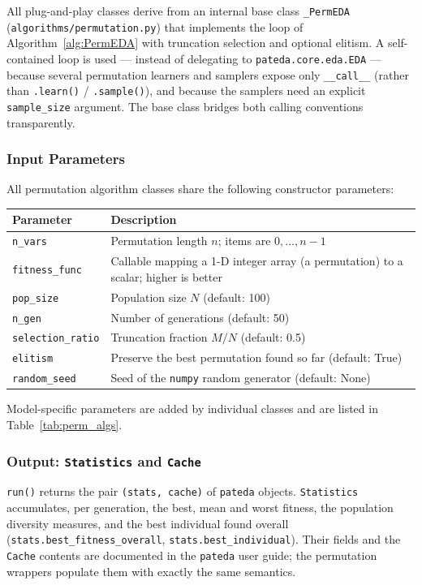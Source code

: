 \documentclass[a4paper,11pt]{article}
\begin{document}
All plug-and-play classes derive from an internal base class \texttt{\_PermEDA}
(\texttt{algorithms/permutation.py}) that implements the loop of
Algorithm~\ref{alg:PermEDA} with truncation selection and optional elitism.  A
self-contained loop is used --- instead of delegating to
\texttt{pateda.core.eda.EDA} --- because several permutation learners and
samplers expose only \texttt{\_\_call\_\_} (rather than \texttt{.learn()} /
\texttt{.sample()}), and because the samplers need an explicit
\texttt{sample\_size} argument.  The base class bridges both calling conventions
transparently.

\subsubsection{Input Parameters}

All permutation algorithm classes share the following constructor parameters:

\begin{center}
\begin{tabular}{lp{9cm}}
\toprule
Parameter & Description \\
\midrule
\texttt{n\_vars} & Permutation length $n$; items are $0,\ldots,n-1$ \\
\texttt{fitness\_func} & Callable mapping a 1-D integer array (a permutation) to
  a scalar; higher is better \\
\texttt{pop\_size} & Population size $N$ (default: 100) \\
\texttt{n\_gen} & Number of generations (default: 50) \\
\texttt{selection\_ratio} & Truncation fraction $M/N$ (default: 0.5) \\
\texttt{elitism} & Preserve the best permutation found so far (default: True) \\
\texttt{random\_seed} & Seed of the \texttt{numpy} random generator
  (default: None) \\
\bottomrule
\end{tabular}
\end{center}

\noindent Model-specific parameters are added by individual classes and are
listed in Table~\ref{tab:perm_algs}.

\subsubsection{Output: \texttt{Statistics} and \texttt{Cache}}

\texttt{run()} returns the pair \texttt{(stats, cache)} of \texttt{pateda}
objects.  \texttt{Statistics} accumulates, per generation, the best, mean and
worst fitness, the population diversity measures, and the best individual found
overall (\texttt{stats.best\_fitness\_overall}, \texttt{stats.best\_individual}).
Their fields and the \texttt{Cache} contents are documented in the
\texttt{pateda} user guide; the permutation wrappers populate them with exactly
the same semantics.
\end{document}
